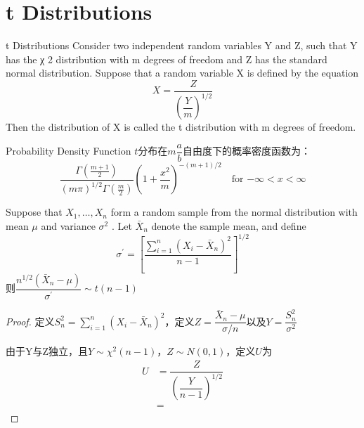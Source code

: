 \documentclass[../main.tex]{subfiles}
\begin{document}
\section{t Distributions}
\begin{definition}{t Distributions}{}
Consider two independent random variables Y and Z, such that Y has the χ 2 distribution with m degrees of freedom and Z has the standard normal distribution. Suppose that a random variable X is deﬁned by the equation
\begin{equation}\label{}
X = \dfrac{Z}{(\dfrac{Y}{m})^{1/2}}
\end{equation}
Then the distribution of X is called the t distribution with m degrees of freedom.
\end{definition}

\begin{theorem}{Probability Density Function}{}
$t$分布在$m \dfrac{a}{b}$自由度下的概率密度函数为：
\begin{equation}\label{}
\dfrac{\Gamma(\frac{m+1}{2})}{(m\pi)^{1/2}\Gamma(\frac{m}{2})}{\left(1+\frac{x^2}{m}\right)}^{-(m+1)/2}\quad\text{for $-\infty<x<\infty$}
\end{equation}
\end{theorem}

\begin{theorem}{}{}
Suppose that $X_1, \dots, X_n$ form a random sample from the normal distribution with
mean $\mu$ and variance $\sigma^2$ . Let $\bar{X}_n$ denote the sample mean, and deﬁne
\begin{equation}\label{}
\sigma^{'}=\left[ \dfrac{\sum\limits_{i=1}^{n}(X_i-\bar{X}_n)^2}{n-1} \right]^{1/2}
\end{equation}
则$\dfrac{n^{1/2}(\bar{X}_n-\mu)}{\sigma^{'}}\sim t(n-1)$
\end{theorem}
\begin{proof}
定义$S_n^2=\sum\limits_{i=1}^{n}(X_i-\bar{X}_n)^2$，定义$Z=\dfrac{\bar{X}_n-\mu}{\sigma/n}$以及$Y=\dfrac{S_n^2}{\sigma^2}$

由于Y与Z独立，且$Y\sim \chi^2(n-1)$，$Z\sim N(0, 1)$，定义$U$为
\begin{equation}\label{}
\begin{split}
U&=\dfrac{Z}{\left(\dfrac{Y}{n-1}\right)^{1/2}}\\
&=
\end{split}
\end{equation}
\end{proof}
\end{document}
